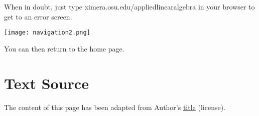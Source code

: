 \documentclass{ximera}
\begin{document}
When in doubt, just type ximera.osu.edu/appliedlinearalgebra in your browser to get to an error screen.

\begin{center}
  \texttt{[image: navigation2.png]}
\end{center}

You can then return to the home page.

\section*{Text Source}
The content of this page has been adapted from  Author's \href{link}{title} (license).
 
 
\end{document}
